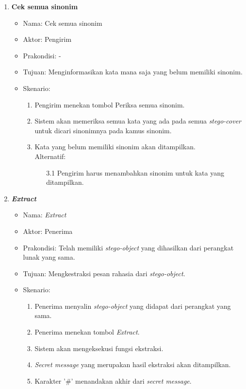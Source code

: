 \begin{enumerate}
	\item \textbf{Cek semua sinonim}
	\begin{itemize}
		\item Nama: Cek semua sinonim
		\item Aktor: Pengirim
		\item Prakondisi: -
		\item Tujuan: Menginformasikan kata mana saja yang belum memiliki sinonim.
		\item Skenario:
		\renewcommand{\labelenumii}{\arabic{enumii}.}
			\begin{enumerate}
				\item Pengirim menekan tombol Periksa semua sinonim.
				\item Sistem akan memeriksa semua kata yang ada pada semua \textit{stego-cover} untuk dicari sinonimnya pada kamus sinonim.
				\item Kata yang belum memiliki sinonim akan ditampilkan.\\
				Alternatif:
				\begin{itemize}
					\item [3.1] Pengirim harus menambahkan sinonim untuk kata yang ditampilkan.
				\end{itemize}
			\end{enumerate}
	\end{itemize}
	
	\item \textbf{\textit{Extract}}
	\begin{itemize}
		\item Nama: \textit{Extract}
		\item Aktor: Penerima
		\item Prakondisi: Telah memiliki \textit{stego-object} yang dihasilkan dari perangkat lunak yang sama.
		\item Tujuan: Mengkestraksi pesan rahasia dari \textit{stego-object}.
		\item Skenario:
		\renewcommand{\labelenumii}{\arabic{enumii}.}
			\begin{enumerate}
				\item Penerima menyalin \textit{stego-object} yang didapat dari perangkat yang sama.
				\item Penerima menekan tombol \textit{Extract}.
				\item Sistem akan mengeksekusi fungsi ekstraksi.
				\item \textit{Secret message} yang merupakan hasil ekstraksi akan ditampilkan.
				\item Karakter '$\#$' menandakan akhir dari \textit{secret message}.
			\end{enumerate}
	\end{itemize}
	

\end{enumerate}
